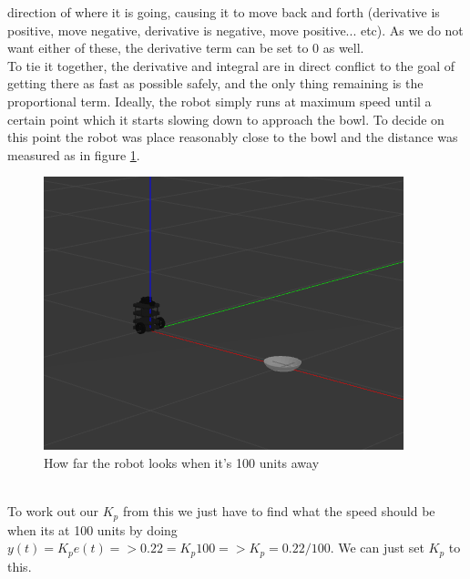 \documentclass{article}
\newcommand\tab[1][1cm]{\hspace*{#1}}
\begin{document}
direction of where it is going, causing it to move back and forth (derivative is
positive, move negative, derivative is negative, move positive... etc). As we do
not want either of these, the derivative term can be set to 0 as well.
\\
\tab To tie it together, the derivative and integral are in direct conflict to
the goal of getting there as fast as possible safely, and the only thing
remaining is the proportional term. Ideally, the robot simply runs at maximum
speed until a certain point which it starts slowing down to approach the bowl.
To decide on this point the robot was place reasonably close to the bowl and the
distance was measured as in figure \ref{100units}.
\begin{figure}[ht]
    \centering
    \includegraphics[scale=0.75]{img/100_units_away.png}
    \caption{How far the robot looks when it's 100 units away}
    \label{100units}
\end{figure}
\\
\tab To work out our $K_p$ from this we just have to find what the speed should be
when its at 100 units by doing $y(t)=K_pe(t) => 0.22 = K_p100 => K_p =
0.22/100$. We can just set $K_p$ to this.
\end{document}
